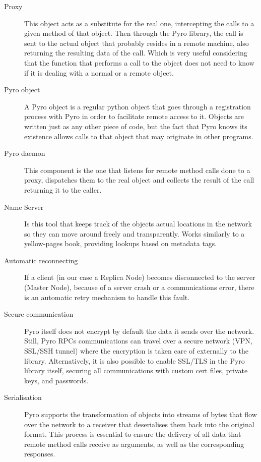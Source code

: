 \begin{description}
	\item [Proxy] This object acts as a substitute for the real one, intercepting the calls to a given method of that object. Then through the Pyro library, the call is sent to the actual object that probably resides in a remote machine, also returning the resulting data of the call. Which is very useful considering that the function that performs a call to the object does not need to know if it is dealing with a normal or a remote object.
	\item [Pyro object] A Pyro object is a regular python object that goes through a registration process with Pyro in order to facilitate remote access to it. Objects are written just as any other piece of code, but the fact that Pyro knows its existence allows calls to that object that may originate in other programs.
	\item [Pyro daemon] This component is the one that listens for remote method calls done to a proxy, dispatches them to the real object and collects the result of the call returning it to the caller.
	\item [Name Server] Is this tool that keeps track of the objects actual locations in the network so they can move around freely and transparently. Works similarly to a yellow-pages book, providing lookups based on metadata tags.
	\item [Automatic reconnecting] If a client (in our case a Replica Node) becomes disconnected to the server (Master Node), because of a server crash or a communications error, there is an automatic retry mechanism to handle this fault.
	\item [Secure communication] Pyro itself does not encrypt by default the data it sends over the network. Still, Pyro RPCs communications can travel over a secure network (VPN, SSL/SSH tunnel) where the encryption is taken care of externally to the library. Alternatively, it is also possible to enable SSL/TLS in the Pyro library itself, securing all communications with custom cert files, private keys, and passwords.
	\item [Serialisation] Pyro supports the transformation of objects into streams of bytes that flow over the network to a receiver that deserialises them back into the original format. This process is essential to ensure the delivery of all data that remote method calls receive as arguments, as well as the corresponding responses.
\end{description}


